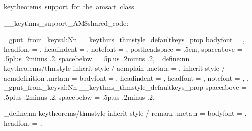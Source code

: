   {keytheorems~support~for~the~amsart~class}

\__keythms_support_AMSshared_code:

  { %
    \prop_gput_from_keyval:Nn \g__keythms_thmstyle_defaultkeys_prop
      {
        bodyfont      = \@acmplainbodyfont,
        headfont      = \@acmplainheadfont,
        headindent    = \@acmplainindent,
        notefont      = \@acmplainnotefont,
        postheadspace = .5em,
        spaceabove    = .5\baselineskip plus .2\baselineskip minus .2\baselineskip,
        spacebelow    = .5\baselineskip plus .2\baselineskip minus .2\baselineskip,
      }
    \keys_define:nn { keytheorems/thmstyle }
      {
        inherit-style / acmplain      .meta:n = {},
        inherit-style / acmdefinition .meta:n =
          {
            bodyfont   = \@acmdefinitionbodyfont,
            headindent = \@acmdefinitionindent,
            headfont   = \@acmdefinitionheadfont,
            notefont   = \@acmdefinitionnotefont,
          },
      }
  }
  {
    \prop_gput_from_keyval:Nn \g__keythms_thmstyle_defaultkeys_prop
      {
        spaceabove    = .5\baselineskip plus .2\baselineskip minus .2\baselineskip,
        spacebelow    = .5\baselineskip plus .2\baselineskip minus .2\baselineskip,
      }
  }

\keys_define:nn { keytheorems/thmstyle }
  {
    inherit-style / remark .meta:n =
      {
        bodyfont = \normalfont,
        headfont = \itshape,
      }
  }